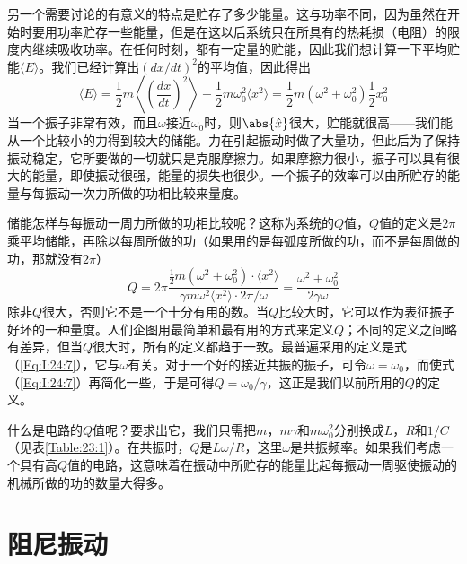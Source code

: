 另一个需要讨论的有意义的特点是贮存了多少能量。这与功率不同，因为虽然在开始时要用功率贮存一些能量，但是在这以后系统只在所具有的热耗损（电阻）的限度内继续吸收功率。在任何时刻，都有一定量的贮能，因此我们想计算一下平均贮能$\langle E \rangle$。我们已经计算出$(dx/dt)^2$的平均值，因此得出
\begin{equation}
    \label{Eq:I:24:6}
    \langle E \rangle = \frac{1}{2}m \left \langle \left ( \frac{dx}{dt} \right )^2 \right \rangle + \frac{1}{2}m\omega_0^2 \langle x^2 \rangle = \frac{1}{2}m(\omega^2 + \omega_0^2)\frac{1}{2}x_0^2
\end{equation}
当一个振子非常有效，而且$\omega$接近$\omega_0$时，则$\abs{\hat{x}}$很大，贮能就很高——我们能从一个比较小的力得到较大的储能。力在引起振动时做了大量功，但此后为了保持振动稳定，它所要做的一切就只是克服摩擦力。如果摩擦力很小，振子可以具有很大的能量，即使振动很强，能量的损失也很少。一个振子的效率可以由所贮存的能量与每振动一次力所做的功相比较来量度。

储能怎样与每振动一周力所做的功相比较呢？这称为系统的$Q$值，$Q$值的定义是$2\pi$乘平均储能，再除以每周所做的功（如果用的是每弧度所做的功，而不是每周做的功，那就没有$2\pi$）
\begin{equation}
    \label{Eq:I:24:7}
    Q=2\pi \frac{\frac{1}{2}m(\omega^2 + \omega_0^2) \cdot \langle x^2 \rangle}{\gamma m \omega^2 \langle x^2 \rangle \cdot 2\pi / \omega} = \frac{\omega^2 + \omega_0^2}{2\gamma\omega}
\end{equation}
除非$Q$很大，否则它不是一个十分有用的数。当$Q$比较大时，它可以作为表征振子好坏的一种量度。人们企图用最简单和最有用的方式来定义$Q$；不同的定义之间略有差异，但当$Q$很大时，所有的定义都趋于一致。最普遍采用的定义是式（\ref{Eq:I:24:7}），它与$\omega$有关。对于一个好的接近共振的振子，可令$\omega=\omega_0$，而使式（\ref{Eq:I:24:7}）再简化一些，于是可得$Q=\omega_0/\gamma$，这正是我们以前所用的$Q$的定义。

什么是电路的$Q$值呢？要求出它，我们只需把$m$，$m\gamma$和$m\omega^2_0$分别换成$L$，$R$和$1/C$（见表\ref{Table:23:1}）。在共振时，$Q$是$L\omega/R$，这里$\omega$是共振频率。如果我们考虑一个具有高$Q$值的电路，这意味着在振动中所贮存的能量比起每振动一周驱使振动的机械所做的功的数量大得多。

\section{阻尼振动}

